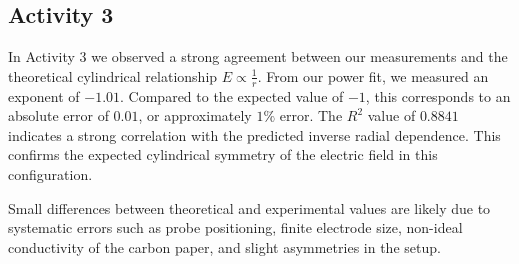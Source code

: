 \documentclass[12pt]{article}
\begin{document}
\subsection*{Activity 3}
In Activity 3 we observed a strong agreement between our measurements and the
theoretical cylindrical relationship $E \propto \frac{1}{r}$. From our power
fit, we measured an exponent of $-1.01$. Compared to the expected value of $-1$,
this corresponds to an absolute error of $0.01$, or approximately $1\%$ error.
The $R^2$ value of $0.8841$ indicates a strong correlation with the predicted
inverse radial dependence. This confirms the expected cylindrical symmetry of
the electric field in this configuration.

Small differences between theoretical and experimental values are likely due to
systematic errors such as probe positioning, finite electrode size, non-ideal
conductivity of the carbon paper, and slight asymmetries in the setup.









\end{document}
